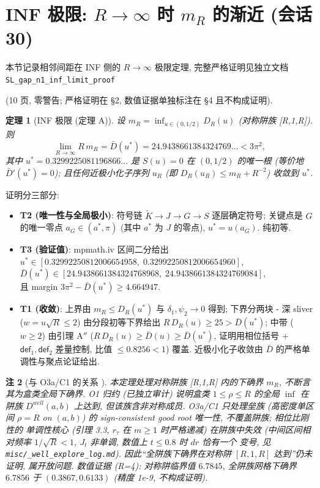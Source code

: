 \documentclass[UTF8]{ctexart}
\newtheorem{theorem}{定理}[section]
\newtheorem{remark}[theorem]{注}
\begin{document}
\section{INF 极限: \texorpdfstring{$R\to\infty$}{R to infinity} 时 \texorpdfstring{$m_R$}{m-R} 的渐近 (会话 30)}

本节记录相邻间距在 INF 侧的 $R\to\infty$ 极限定理, 完整严格证明见独立文档\\
\texttt{SL\_gap\_n1\_inf\_limit\_proof}

(10 页, 零警告; 严格证明在 §2, 数值证据单独标注在 §4 且不构成证明).

\begin{theorem}[INF 极限 (定理 A)]
设 $m_R=\inf_{u\in(0,1/2)}D_R(u)$ (对称阱族 [R,1,R]). 则
\begin{equation}
	\lim_{R\to\infty}R\,m_R=\bar D(u^*)=24.9438661384324769\ldots<3\pi^2,
\end{equation}
其中 $u^*=0.3299225081196866\ldots$ 是 $S(u)=0$ 在 $(0,1/2)$ 的唯一根
(等价地 $\bar D'(u^*)=0$); 且任何近极小化子序列 $u_R$ (即 $D_R(u_R)\le m_R+R^{-2}$)
收敛到 $u^*$.
\end{theorem}

证明分三部分:
\begin{itemize}
	\item \textbf{T2 (唯一性与全局极小)}: 符号链 $\widetilde K\to J\to G\to S$
		逐层确定符号; 关键点是 $G$ 的唯一零点 $a_G\in(a^*,\pi)$ (其中 $a^*$ 为 $J$
		的零点), $u^*=u(a_G)$. 纯初等.
	\item \textbf{T3 (验证值)}: mpmath.iv 区间二分给出\\
		$u^*\in[0.32992250812006654958,\;0.32992250812006654960]$,\\
		$\bar D(u^*)\in[24.9438661384324768968,\;24.9438661384324769084]$,\\
		且 margin $3\pi^2-\bar D(u^*)\ge4.664947$.
	\item \textbf{T1 (收敛)}: 上界由 $m_R\le D_R(u^*)$ 与 $\delta_1,\psi_2\to0$ 得到;
		下界分两块 - 深 sliver ($w=u\sqrt R\le2$) 由分段初等下界给出
		$R\,D_R(u)\ge25>\bar D(u^*)$; 中带 ($w\ge2$) 由引理 A$''$
		($R\,D_R(u)\ge\bar D(u)\ge\bar D(u^*)$, 证明用相位括号 + $\mathsf{def}_1,
		\mathsf{def}_2$ 差量控制, 比值 $\le0.8256<1$) 覆盖. 近极小化子收敛由
		$\bar D$ 的严格单调性与聚点论证给出.
\end{itemize}

\begin{remark}[与 O3a/C1 的关系 \label{rem:inf-gap}]
本定理处理对称阱族 [R,1,R] 内的下确界 $m_R$, \emph{不}断言其为盒类全局下确界.
O1 归约 (已独立审计) 说明盒类 $1\le\rho\le R$ 的全局 $\inf$ 在阱族 $D^{well}(a,b)$
上达到, 但该族含非对称成员. O3a/C1 只处理\emph{垒族} (高密度单区间 $\rho=R$ on
$(a,b)$) 的 sign-consistent good root 唯一性, \emph{不}覆盖阱族; 相位比刚性的
单调性核心 (引理 3.3, $r_\tau$ 在 $m\ge1$ 时严格递减) 在阱族中失效
(中间区间相对频率 $1/\sqrt R<1$, $J_t$ 非单调, 数值上 $t\le0.8$ 时 $dr$ 恰有一个
变号, 见 \texttt{misc/\_well\_explore\_log.md}). 因此``全阱族下确界在对称阱
$[R,1,R]$ 达到''仍未证明, 属开放问题. 数值证据 (R=4): 对称阱临界值 $6.7845$,
全阱族网格下确界 $6.7856$ 于 $(0.3867,0.6133)$ (精度 1e-9, 不构成证明).
\end{remark}
\end{document}
